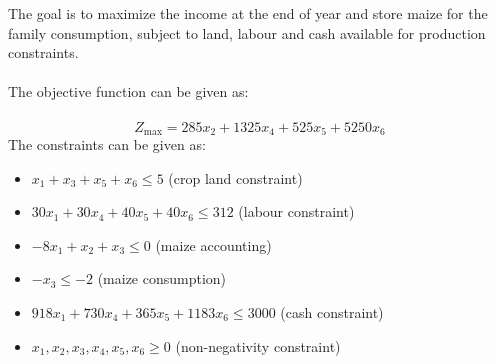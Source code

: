 \documentclass[conference]{IEEEtran}
\begin{document}
The goal is to maximize the income at the end of year and store maize for the family consumption, subject to land, labour and cash available for production constraints.
\\\\
The objective function can be given as:
\\\\
\[ Z_{\text{max}} = 285x_2 + 1325x_4 + 525x_5 + 5250x_6
\]
The constraints can be given as:
\small{
\begin{itemize}
    \item $x_1 + x_3 + x_5 + x_6 \leq 5$ (crop land constraint)
    \item $30x_1 + 30x_4 + 40x_5 + 40x_6 \leq 312$ (labour constraint)
    \item $-8x_1 + x_2 + x_3 \leq 0$ (maize accounting)
    \item $-x_3 \leq -2$ (maize consumption)
    \item $918x_1 + 730x_4 + 365x_5 + 1183x_6 \leq 3000$ (cash constraint)
    \item $x_1,x_2,x_3,x_4,x_5,x_6 \geq 0	$ (non-negativity constraint)

\end{itemize}
}

\begin{table}[h!]
    \centering
    \small
    \setlength\tabcolsep{1pt}
\end{table}
\end{document}
